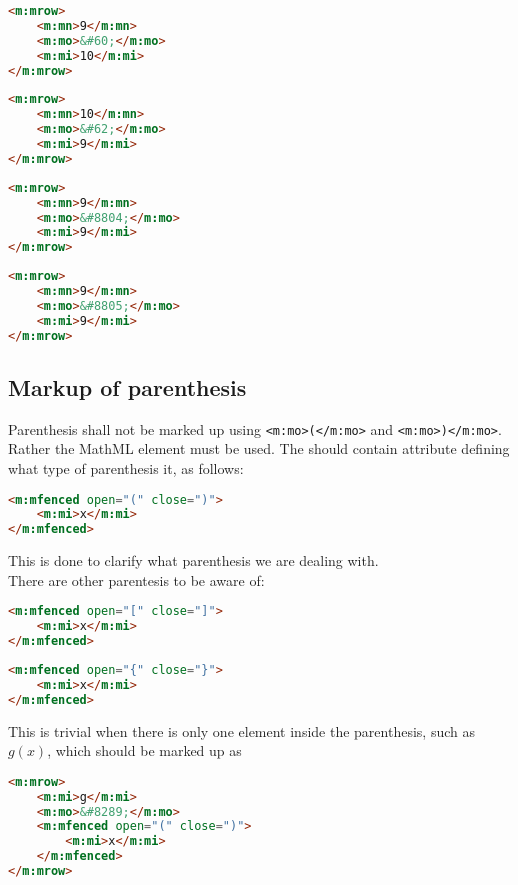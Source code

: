 \documentclass[english,a4paper,11pt]{article}
\begin{document}
\begin{lstlisting}[language=HTML, caption={$9 < 10$}]
<m:mrow> 
	<m:mn>9</m:mn>
	<m:mo>&#60;</m:mo>
	<m:mi>10</m:mi>
</m:mrow>
\end{lstlisting}
\bigskip
\begin{lstlisting}[language=HTML, caption={$10 > 9$}]
<m:mrow> 
	<m:mn>10</m:mn>
	<m:mo>&#62;</m:mo>
	<m:mi>9</m:mi>
</m:mrow>
\end{lstlisting}
\bigskip
\begin{lstlisting}[language=HTML, caption={$9 \leq 9$}]
<m:mrow> 
	<m:mn>9</m:mn>
	<m:mo>&#8804;</m:mo>
	<m:mi>9</m:mi>
</m:mrow>
\end{lstlisting}
\bigskip
\begin{lstlisting}[language=HTML, caption={$9 \geq 9$}]
<m:mrow> 
	<m:mn>9</m:mn>
	<m:mo>&#8805;</m:mo>
	<m:mi>9</m:mi>
</m:mrow>
\end{lstlisting}

\subsection{Markup of parenthesis}

Parenthesis shall not be marked up using \verb|<m:mo>(</m:mo>| and \verb|<m:mo>)</m:mo>|. Rather the MathML element  must be used. 
The  should contain attribute defining what type of parenthesis it, as follows: 
\begin{lstlisting}[language=HTML]
<m:mfenced open="(" close=")">
	<m:mi>x</m:mi>
</m:mfenced>
\end{lstlisting}
This is done to clarify what parenthesis we are dealing with.\\
\bigskip
There are other parentesis to be aware of:

\begin{lstlisting}[language=HTML, caption={Square bracket}]
<m:mfenced open="[" close="]">
	<m:mi>x</m:mi>
</m:mfenced>
\end{lstlisting}

\begin{lstlisting}[language=HTML, caption={Curly bracket}]
<m:mfenced open="{" close="}">
	<m:mi>x</m:mi>
</m:mfenced>
\end{lstlisting}

This is trivial when there is only one element inside the parenthesis, such as $g(x)$, which should be marked up as
\begin{lstlisting}[language=HTML]
<m:mrow>
	<m:mi>g</m:mi>
	<m:mo>&#8289;</m:mo>
	<m:mfenced open="(" close=")">
		<m:mi>x</m:mi>
	</m:mfenced>
</m:mrow>
\end{lstlisting}
\end{document}
